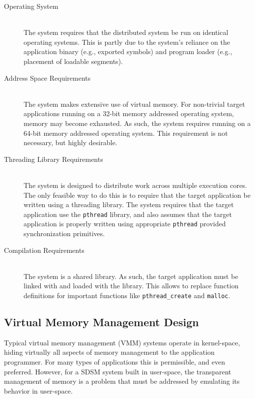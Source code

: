 \begin{description}
\item[Operating System] \hfill \\
The \projname{} system requires that the distributed system be run on identical operating systems.  This is partly due to the system's reliance on the application binary (e.g., exported symbols) and program loader (e.g., placement of loadable segments).

\item[Address Space Requirements] \hfill \\
The \projname{} system makes extensive use of virtual memory.  For non-trivial target applications running on a 32-bit memory addressed operating system, memory may become exhausted.  As such, the \projname{} system requires running on a 64-bit memory addressed operating system.  This requirement is not necessary, but highly desirable.

\item[Threading Library Requirements] \hfill \\
 The \projname{} system is designed to distribute work across multiple execution cores.  The only feasible way to do this is to require that the target application be written using a threading library.  The \projname{} system requires that the target application use the \verb,pthread, library, and also assumes that the target application is properly written using appropriate \verb,pthread, provided synchronization primitives.

\item[Compilation Requirements] \hfill \\
The \projname{} system is a shared library.  As such, the target application must be linked with and loaded with the \projname{} library.  This allows \projname{} to replace function definitions for important functions like \verb,pthread_create, and \verb,malloc,.
\end{description}


\subsection{Virtual Memory Management Design}

Typical virtual memory management (VMM) systems operate in kernel-space, hiding virtually all aspects of memory management to the application programmer.  For many types of applications this is permissible, and even preferred.  However, for a SDSM system built in user-space, the transparent management of memory is a problem that must be addressed by emulating its behavior in user-space.


